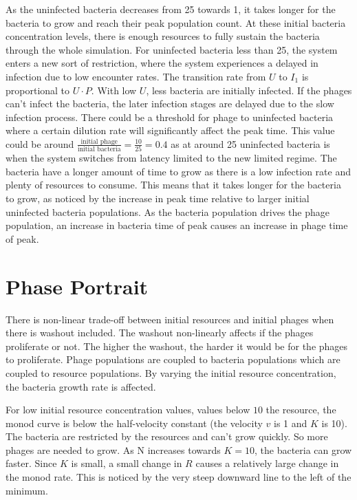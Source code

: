 As the uninfected bacteria decreases from 25 towards 1, it takes longer for the bacteria to grow and reach their peak population count. 
At these initial bacteria concentration levels, there is enough resources to fully sustain the bacteria through the whole simulation. 
For uninfected bacteria less than 25, the system enters a new sort of restriction, where the system experiences a delayed in infection due to low encounter rates. 
The transition rate from $U$ to $I_1$ is proportional to $U\cdot P$. 
With low $U$, less bacteria are initially infected. 
If the phages can't infect the bacteria, the later infection stages are delayed due to the slow infection process. 
There could be a threshold for phage to uninfected bacteria where a certain dilution rate will significantly affect the peak time. 
This value could be around $\frac{\text{initial phage}}{\text{initial bacteria}} = \frac{10}{25} = 0.4$ as at around 25 uninfected bacteria is when the system switches from latency limited to the new limited regime. 
The bacteria have a longer amount of time to grow as there is a low infection rate and plenty of resources to consume. 
This means that it takes longer for the bacteria to grow, as noticed by the increase in peak time relative to larger initial uninfected bacteria populations. 
As the bacteria population drives the phage population, an increase in bacteria time of peak causes an increase in phage time of peak. 


\section{Phase Portrait}
There is non-linear trade-off between initial resources and initial phages when there is washout included. 
The washout non-linearly affects if the phages proliferate or not. 
The higher the washout, the harder it would be for the phages to proliferate. 
Phage populations are coupled to bacteria populations which are coupled to resource populations. 
By varying the initial resource concentration, the bacteria growth rate is affected. 

For low initial resource concentration values, values below $10$ the resource, the monod curve is below the half-velocity constant (the velocity $v$ is 1 and $K$ is 10). 
The bacteria are restricted by the resources and can't grow quickly. 
So more phages are needed to grow. 
As N increases towards $K=10$, the bacteria can grow faster. 
Since $K$ is small, a small change in $R$ causes a relatively large change in the monod rate. 
This is noticed by the very steep downward line to the left of the minimum. 

